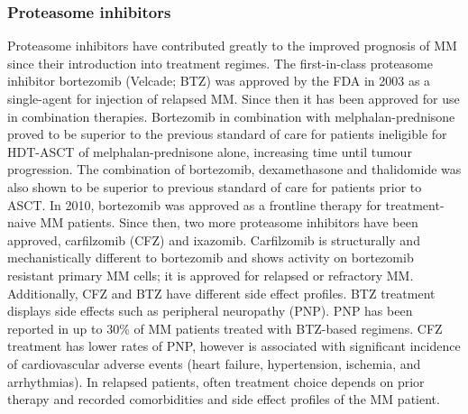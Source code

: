 

\subsubsection{Proteasome inhibitors}
Proteasome inhibitors have contributed greatly to the improved prognosis of MM since their introduction into treatment regimes.
The first-in-class proteasome inhibitor bortezomib (Velcade\textsuperscript{\textregistered}; BTZ) was approved by the FDA in 2003 as a single-agent for injection of relapsed MM\cite{kane2003velcade}.
Since then it has been approved for use in combination therapies.
Bortezomib in combination with melphalan-prednisone proved to be superior to the previous standard of care for patients ineligible for HDT-ASCT of melphalan-prednisone alone, increasing time until tumour progression\cite{san2008bortezomib}.
The combination of bortezomib, dexamethasone and thalidomide  was also shown to be superior to previous standard of care for patients prior to ASCT\cite{moreau2012proteasome}.
In 2010, bortezomib was approved as a frontline therapy for treatment-naive MM patients.
Since then, two more proteasome inhibitors have been approved, carfilzomib (CFZ) and ixazomib.
Carfilzomib is structurally and mechanistically different to bortezomib and shows activity on bortezomib resistant primary MM cells\cite{moreau2012proteasome}; it is approved for relapsed or refractory MM\@.
Additionally, CFZ and BTZ have different side effect profiles.
BTZ treatment displays side effects such as peripheral neuropathy (PNP).
PNP has been reported in up to 30\% of MM patients treated with BTZ-based regimens\cite{mushtaq2018efficacy}.
CFZ treatment has lower rates of PNP, however is associated with significant incidence of cardiovascular adverse events (heart failure, hypertension, ischemia, and arrhythmias)\cite{waxman2018carfilzomib}.
In relapsed patients, often treatment choice depends on prior therapy and recorded comorbidities and side effect profiles of the MM patient.

